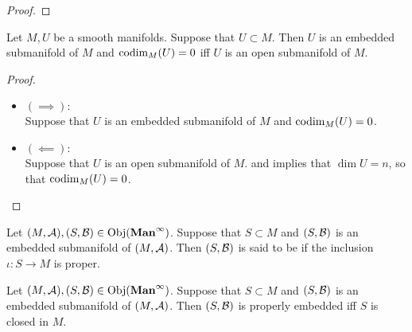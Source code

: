\documentclass{book}
\begin{document}
	\begin{proof}
	\end{proof}

	\begin{ex} 
		Let $M, U$ be a smooth manifolds. Suppose that $U \subset M$. Then $U$ is an embedded submanifold of $M$ and $\operatorname{codim}_M(U) = 0$ iff $U$ is an open submanifold of $M$. 
	\end{ex}

	\begin{proof}\
		\begin{itemize}
			\item $(\implies):$ \\
			Suppose that $U$ is an embedded submanifold of $M$ and $\operatorname{codim}_M(U) = 0$. 
			\item $(\impliedby):$ \\
			Suppose that $U$ is an open submanifold of $M$.   and  implies that $\dim U = n$, so that $\operatorname{codim}_M(U) = 0$.
		\end{itemize}
	\end{proof}

	\begin{defn}
		Let $(M, \mathcal{A}), (S, \mathcal{B}) \in \operatorname{Obj}(\operatorname*{\text{\textbf{Man}}^{\infty}})$. Suppose that $S \subset M$ and $(S, \mathcal{B})$ is an embedded submanifold of $(M, \mathcal{A})$. Then $(S, \mathcal{B})$ is said to be  if the inclusion $\iota:S \rightarrow M$ is proper.
	\end{defn}

	\begin{ex}
		Let $(M, \mathcal{A}), (S, \mathcal{B}) \in \operatorname{Obj}(\operatorname*{\text{\textbf{Man}}^{\infty}})$. Suppose that $S \subset M$ and $(S, \mathcal{B})$ is an embedded submanifold of $(M, \mathcal{A})$. Then $(S, \mathcal{B})$ is properly embedded iff $S$ is closed in $M$. 
	\end{ex}
\end{document}
